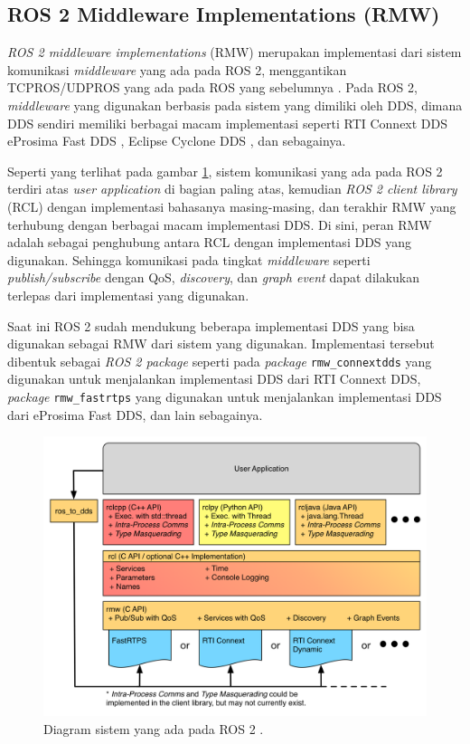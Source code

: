 \subsection{ROS 2 Middleware Implementations (RMW)}
\label{subsec:rmw}

\emph{ROS 2 middleware implementations} (RMW) merupakan implementasi dari sistem komunikasi \emph{middleware} yang ada pada ROS 2,
  menggantikan TCPROS/UDPROS yang ada pada ROS yang sebelumnya \citep{url:rmwdesign}.
Pada ROS 2, \emph{middleware} yang digunakan berbasis pada sistem yang dimiliki oleh DDS,
  dimana DDS sendiri memiliki berbagai macam implementasi seperti RTI Connext DDS \citep{url:rmwdesign} eProsima Fast DDS \citep{url:fastdds},
  Eclipse Cyclone DDS \citep{url:cyclonedds},
  dan sebagainya.

Seperti yang terlihat pada gambar \ref{fig:diagramsistemros2},
  sistem komunikasi yang ada pada ROS 2 terdiri atas \emph{user application} di bagian paling atas,
  kemudian \emph{ROS 2 client library} (RCL) dengan implementasi bahasanya masing-masing,
  dan terakhir RMW yang terhubung dengan berbagai macam implementasi DDS.
Di sini, peran RMW adalah sebagai penghubung antara RCL dengan implementasi DDS yang digunakan.
Sehingga komunikasi pada tingkat \emph{middleware} seperti \emph{publish/subscribe} dengan QoS, \emph{discovery},
  dan \emph{graph event} dapat dilakukan terlepas dari implementasi yang digunakan.

Saat ini ROS 2 sudah mendukung beberapa implementasi DDS yang bisa digunakan sebagai RMW dari sistem yang digunakan.
  Implementasi tersebut dibentuk sebagai \emph{ROS 2 package} seperti pada \emph{package} \lstinline{rmw_connextdds} yang digunakan untuk menjalankan implementasi DDS dari RTI Connext DDS,
  \emph{package} \lstinline{rmw_fastrtps} yang digunakan untuk menjalankan implementasi DDS dari eProsima Fast DDS,
  dan lain sebagainya.

\begin{figure}
  \centering
  \includegraphics[scale=0.6]{gambar/diagram-sistem-ros2.png}
  \caption{Diagram sistem yang ada pada ROS 2 \citep{url:ros2interfacesconcept}.}
  \label{fig:diagramsistemros2}
\end{figure}
